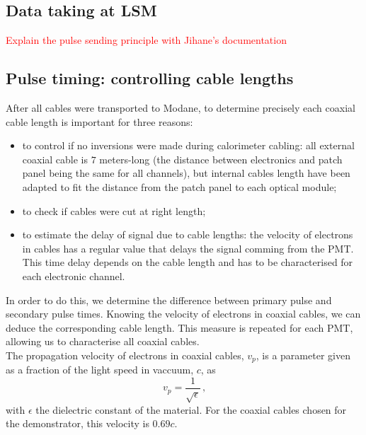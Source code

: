 \subsection{Data taking at LSM}
\textcolor{red}{Explain the pulse sending principle with Jihane's documentation}

\subsection{Pulse timing: controlling cable lengths}
\label{subsec:timing}

After all cables were transported to Modane, to determine precisely each coaxial cable length is important for three reasons:
\begin{itemize}
\item to control if no inversions were made during calorimeter cabling: all external coaxial cable is $7$ meters-long (the distance between electronics and patch panel being the same for all channels), but internal cables length have been adapted to fit the distance from the patch panel to each optical module;
\item to check if cables were cut at right length;
\item to estimate the delay of signal due to cable lengths: the velocity of electrons in cables has a regular value that delays the signal comming from the PMT. This time delay depends on the cable length and has to be characterised for each electronic channel.
\end{itemize}
In order to do this, we determine the difference between primary pulse and secondary pulse times.
Knowing the velocity of electrons in coaxial cables, we can deduce the corresponding cable length.
This measure is repeated for each PMT, allowing us to characterise all coaxial cables.\\
The propagation velocity of electrons in coaxial cables, $v_{p}$, is a parameter given as a fraction of the light speed in vaccuum, $c$, as
\begin{equation*}
  v_{p}=\frac{1}{\sqrt{\epsilon}}\,\text{,}
\end{equation*}
with $\epsilon$ the dielectric constant of the material.
For the coaxial cables chosen for the demonstrator, this velocity is $0.69c$.

